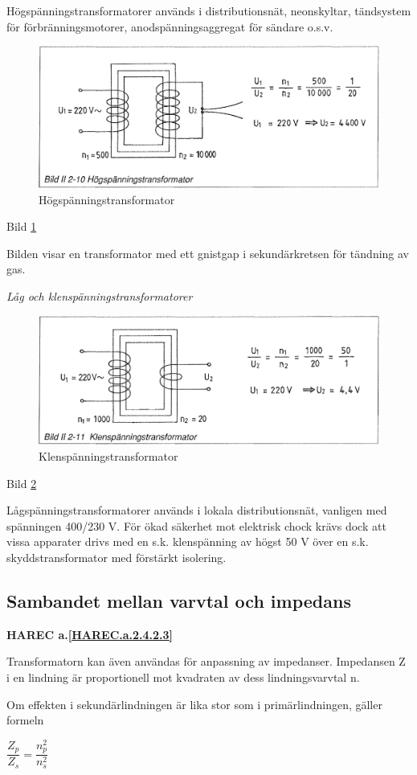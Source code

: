 Högspänningstransformatorer används i distributionsnät, neonskyltar, tändsystem
för förbränningsmotorer, anodspänningsaggregat för sändare o.s.v.

\begin{figure}[h]
\begin{center}
\includegraphics[width=\textwidth]{images/bild_2_2-10}
\caption{Högspänningstransformator}
\label{fig:BildII2-10}
\end{center}
\end{figure}

Bild \ref{fig:BildII2-10}

Bilden visar en transformator med ett gnistgap i sekundärkretsen för tändning av
gas.

\emph{Låg och klenspänningstransformatorer}

\begin{figure}[h]
\begin{center}
\includegraphics[width=\textwidth]{images/bild_2_2-11}
\caption{Klenspänningstransformator}
\label{fig:BildII2-11}
\end{center}
\end{figure}

Bild \ref{fig:BildII2-11}

Lågspänningstransformatorer används i lokala distributionsnät, vanligen med
spänningen 400/230 V. För ökad säkerhet mot elektrisk chock krävs dock att vissa
apparater drivs med en s.k. klenspänning av högst 50 V över en s.k.
skyddstransformator med förstärkt isolering.

\subsection{Sambandet mellan varvtal och impedans}
\textbf{HAREC a.\ref{HAREC.a.2.4.2.3}\label{myHAREC.a.2.4.2.3}}

Transformatorn kan även användas för anpassning av impedanser. Impedansen Z i en
lindning är proportionell mot kvadraten av dess lindningsvarvtal n.

Om effekten i sekundärlindningen är lika stor som i primärlindningen, gäller
formeln

\(\dfrac{Z_p}{Z_s} = \dfrac{n_p^2}{n_s^2}\)
